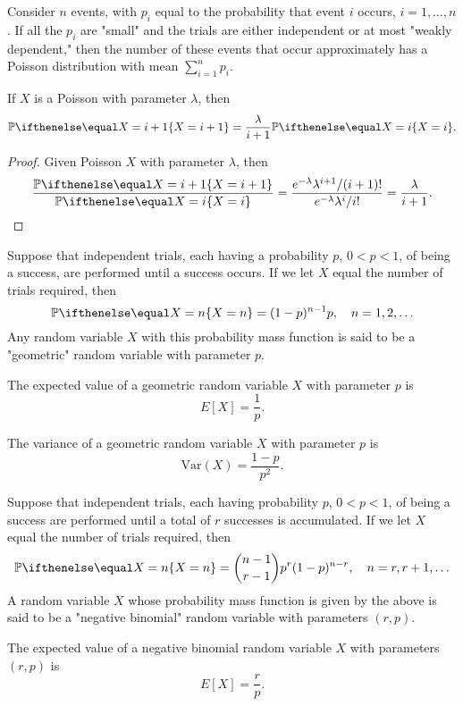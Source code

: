 \documentclass[a4paper,8pt]{article}
\begin{document}
\begin{outline}
    Consider \(n\) events, with \(p_i\) equal to the probability that event \(i\) occurs, \(i=1,\ldots,n\).
    If all the \(p_i\) are "small" and the trials are either independent or at most "weakly dependent,"
    then the number of these events that occur approximately has a Poisson distribution with mean \(\sum_{i=1}^np_i\).

    If \(X\) is a Poisson with parameter \(\lambda\), then \[ \bbp[X=i+1] = \frac{\lambda}{i+1}\bbp[X=i]\text{.} \]

    \begin{proof}
      Given Poisson \(X\) with parameter \(\lambda\), then
      \[
        \frac{\bbp[X=i+1]}{\bbp[X=i]}
        = \frac{e^{-\lambda}\lambda^{i+1}/(i+1)!}{e^{-\lambda}\lambda^i/i!}
        = \frac{\lambda}{i+1}\text{.}
      \]
    \end{proof}

    Suppose that independent trials, each having a probability \(p\), \(0 < p < 1\), of being a success, are performed
    until a success occurs. If we let \(X\) equal the number of trials required, then
    \[ \bbp[X=n] = (1-p)^{n-1}p,\quad n = 1,2,\ldots \]
    Any random variable \(X\) with this probability mass function is said to be a "geometric" random variable with parameter \(p\).

    The expected value of a geometric random variable \(X\) with parameter \(p\) is \[E[X] = \frac{1}{p}\text{.}\]

    The variance of a geometric random variable \(X\) with parameter \(p\) is \[\text{Var}(X) = \frac{1-p}{p^2}\text{.}\]

    Suppose that independent trials, each having probability \(p\), \(0 < p < 1\), of being a success are performed until a
    total of \(r\) successes is accumulated. If we let \(X\) equal the number of trials required, then
    \[ \bbp[X=n] = \binom{n-1}{r-1}p^r(1-p)^{n-r},\quad n = r, r+1, \ldots \]
    A random variable \(X\) whose probability mass function is given by the above is said to be a "negative binomial" random
    variable with parameters \((r, p)\).

    The expected value of a negative binomial random variable \(X\) with parameters \((r, p)\) is \[E[X] = \frac{r}{p}\text{.}\]


\end{outline}
\end{document}
